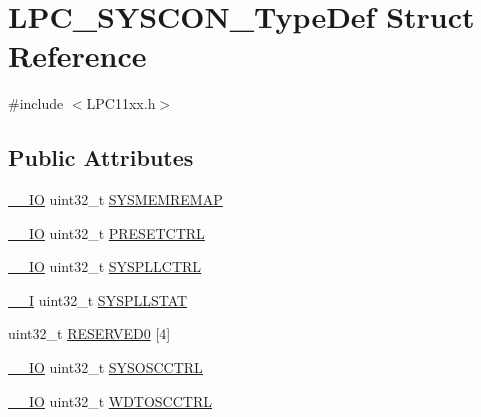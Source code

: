 \hypertarget{struct_l_p_c___s_y_s_c_o_n___type_def}{}\section{L\+P\+C\+\_\+\+S\+Y\+S\+C\+O\+N\+\_\+\+Type\+Def Struct Reference}
\label{struct_l_p_c___s_y_s_c_o_n___type_def}


{\ttfamily \#include $<$L\+P\+C11xx.\+h$>$}

\subsection*{Public Attributes}
\begin{DoxyCompactItemize}
\item 
\hyperlink{group___c_m_s_i_s__core__definitions_gaec43007d9998a0a0e01faede4133d6be}{\+\_\+\+\_\+\+IO} uint32\+\_\+t \hyperlink{group___l_p_c11xx___definitions_ga970fb69752548b297feae4645834cce1}{S\+Y\+S\+M\+E\+M\+R\+E\+M\+AP}
\item 
\hyperlink{group___c_m_s_i_s__core__definitions_gaec43007d9998a0a0e01faede4133d6be}{\+\_\+\+\_\+\+IO} uint32\+\_\+t \hyperlink{group___l_p_c11xx___definitions_gaf1a4b05ee430bb29acff26d16d65448d}{P\+R\+E\+S\+E\+T\+C\+T\+RL}
\item 
\hyperlink{group___c_m_s_i_s__core__definitions_gaec43007d9998a0a0e01faede4133d6be}{\+\_\+\+\_\+\+IO} uint32\+\_\+t \hyperlink{group___l_p_c11xx___definitions_ga7c74ae51f98b5315c25dd045ce363f55}{S\+Y\+S\+P\+L\+L\+C\+T\+RL}
\item 
\hyperlink{group___c_m_s_i_s__core__definitions_gaf63697ed9952cc71e1225efe205f6cd3}{\+\_\+\+\_\+I} uint32\+\_\+t \hyperlink{group___l_p_c11xx___definitions_gac3657072d53aa3907b0d49c252c7437f}{S\+Y\+S\+P\+L\+L\+S\+T\+AT}
\item 
uint32\+\_\+t \hyperlink{group___l_p_c11xx___definitions_ga3b1f45f981b0b5c60a243403b3c158b9}{R\+E\+S\+E\+R\+V\+E\+D0} \mbox{[}4\mbox{]}
\item 
\hyperlink{group___c_m_s_i_s__core__definitions_gaec43007d9998a0a0e01faede4133d6be}{\+\_\+\+\_\+\+IO} uint32\+\_\+t \hyperlink{group___l_p_c11xx___definitions_gafe759a051315e5daf1fe3d621bb72814}{S\+Y\+S\+O\+S\+C\+C\+T\+RL}
\item 
\hyperlink{group___c_m_s_i_s__core__definitions_gaec43007d9998a0a0e01faede4133d6be}{\+\_\+\+\_\+\+IO} uint32\+\_\+t \hyperlink{group___l_p_c11xx___definitions_ga3ca10fa6e4f236c2f1a9dd0a801f81b3}{W\+D\+T\+O\+S\+C\+C\+T\+RL}

\end{DoxyCompactItemize}
